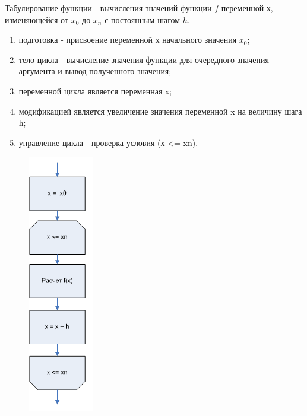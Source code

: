 \documentclass{beamer}
\begin{document}
\begin{frame}
Табулирование функции - вычисления значений функции $f$ переменной $х$, изменяющейся от $x_0$ до $x_n$ с постоянным шагом $h$. 
\begin{minipage}{0.6\textwidth}
\begin{flushleft}
\begin{enumerate}
\item подготовка - присвоение переменной х начального значения $x_0$; 
\item тело цикла - вычисление значения функции для очередного значения аргумента и вывод полученного значения; 
\item переменной цикла является переменная x; 
\item модификацией является увеличение значения переменной x на величину шага h;
\item управление цикла - проверка условия (х <= xn).
\end{enumerate}
\end{flushleft}
\end{minipage}
\begin{minipage}{0.2\textwidth}
\begin{flushright}
\begin{figure}[h]
\includegraphics[scale=0.6]{images/lec04-pic02.png}
\end{figure}
\end{flushright}
\end{minipage}
\end{frame}
\end{document}
